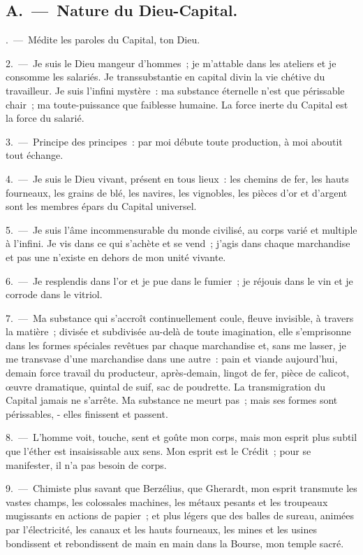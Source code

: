 \documentclass[french,twoside]{book} %
\begin{document}
\subsection[{A. — Nature du Dieu-Capital.}]{A. — Nature du Dieu-Capital.}
. — Médite les paroles du Capital, ton Dieu.\par
2. — Je suis le Dieu mangeur d’hommes ; je m’attable dans les ateliers et je consomme les salariés. Je transsubstantie en capital divin la vie chétive du travailleur. Je suis l’infini mystère : ma substance éternelle n’est que périssable chair ; ma toute-puissance que faiblesse humaine. La force inerte du Capital est la force du salarié.\par
3. — Principe des principes : par moi débute toute production, à moi aboutit tout échange.\par
4. — Je suis le Dieu vivant, présent en tous lieux : les chemins de fer, les hauts fourneaux, les grains de blé, les navires, les vignobles, les pièces d’or et d’argent sont les membres épars du Capital universel.\par
5. — Je suis l’âme incommensurable du monde civilisé, au corps varié et multiple à l’infini. Je vis dans ce qui s’achète et se vend ; j’agis dans chaque marchandise et pas une n’existe en dehors de mon unité vivante.\par
6. — Je resplendis dans l’or et je pue dans le fumier ; je réjouis dans le vin et je corrode dans le vitriol.\par
7. — Ma substance qui s’accroît continuellement coule, fleuve invisible, à travers la matière ; divisée et subdivisée au-delà de toute imagination, elle s’emprisonne dans les formes spéciales revêtues par chaque marchandise et, sans me lasser, je me transvase d’une marchandise dans une autre : pain et viande aujourd’hui, demain force travail du producteur, après-demain, lingot de fer, pièce de calicot, œuvre dramatique, quintal de suif, sac de poudrette. La transmigration du Capital jamais ne s’arrête. Ma substance ne meurt pas ; mais ses formes sont périssables, - elles finissent et passent.\par
8. — L'homme voit, touche, sent et goûte mon corps, mais mon esprit plus subtil que l’éther est insaisissable aux sens. Mon esprit est le Crédit ; pour se manifester, il n’a pas besoin de corps.\par
9. — Chimiste plus savant que Berzélius, que Gherardt, mon esprit transmute les vastes champs, les colossales machines, les métaux pesants et les troupeaux mugissants en actions de papier ; et plus légers que des balles de sureau, animées par l’électricité, les canaux et les hauts fourneaux, les mines et les usines bondissent et rebondissent de main en main dans la Bourse, mon temple sacré.\par
\end{document}
